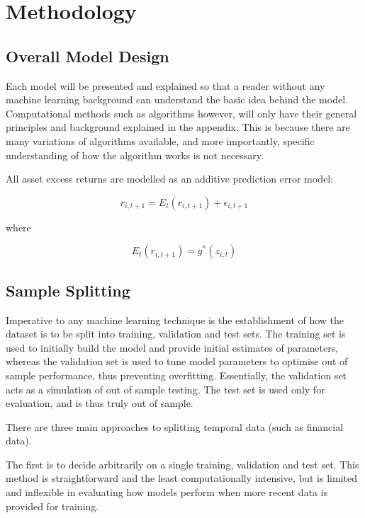 \documentclass[man, a4paper, biblatex]{article}
\begin{document}
\section{Methodology}

\subsection{Overall Model Design}

Each model will be presented and explained so that a reader without any machine learning background can understand the basic idea behind the model. Computational methods such as algorithms however, will only have their general principles and background explained in the appendix. This is because there are many variations of algorithms available, and more importantly, specific understanding of how the algorithm works is not necessary. 

All asset excess returns are modelled as an additive prediction error model:

\begin{equation}
	r_{i, t+1} = E_t(r_{i, t+1}) + \epsilon_{i, t+1}
\end{equation}

where 

\begin{equation}
	E_t(r_{i, t+1}) = g^*(z_{i,t})
\end{equation}

\subsection{Sample Splitting}

Imperative to any machine learning technique is the establishment of how the dataset is to be split into training, validation and test sets. The training set is used to initially build the model and provide initial estimates of parameters, whereas the validation set is used to tune model parameters to optimise out of sample performance, thus preventing overfitting. Essentially, the validation set acts as a simulation of out of sample testing. The test set is used only for evaluation, and is thus truly out of sample.

There are three main approaches to splitting temporal data (such as financial data). 

The first is to decide arbitrarily on a single training, validation and test set. This method is straightforward and the least computationally intensive, but is limited and inflexible in evaluating how models perform when more recent data is provided for training. 
\end{document}
